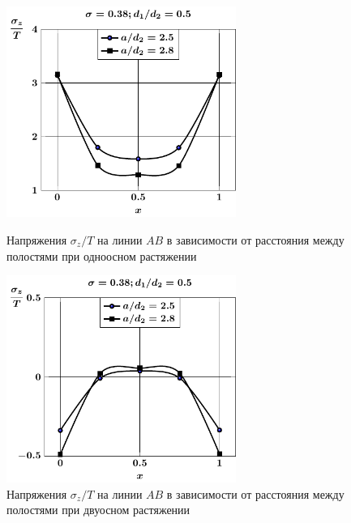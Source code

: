 \begin{figure}[h!]
\centering\footnotesize
\parbox[b]{7.5cm}{\centering\includegraphics[width=7.5cm]{periodic-oblate-cav27-a-d50-t1-sig_z.pdf}
\caption{Напряжения $\sigma_z/T$ на линии $AB$ в зависимости от расстояния между полостями при одноосном растяжении
\label{f:11:39}}}\hfil\hfil
\parbox[b]{7.5cm}{\centering\includegraphics[width=7.5cm]{periodic-oblate-cav27-a-d50-t2-sig_z.pdf}
\caption{Напряжения $\sigma_z/T$ на линии $AB$ в зависимости от расстояния между полостями при двуосном растяжении
\label{f:11:40}}}
\end{figure}


